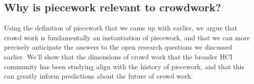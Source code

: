 \documentclass[trackingWork]{subfiles}
\begin{document}


\subsection{Why is piecework relevant to crowdwork?}
Using the definition of piecework that we came up with earlier, we argue that
crowd work is fundamentally an instantiation of piecework, and
that we can more precisely anticipate the answers to the open research questions we discussed earlier.
We'll show that the dimensions of crowd work that the broader HCI community has been studying
align with the history of piecework, and that this can greatly inform predictions about the future of crowd work.


\onlyinsubfile{
  \printbibliography
  }
\end{document}
